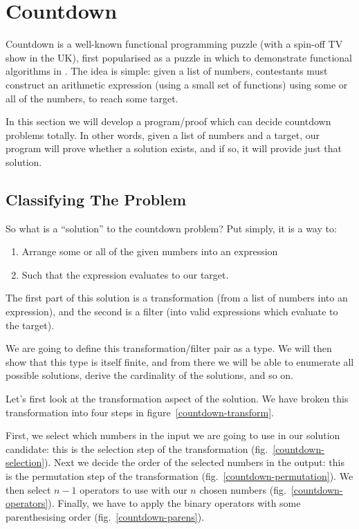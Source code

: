 \chapter{Countdown}
Countdown is a well-known functional programming puzzle (with a spin-off TV show
in the UK), first popularised as a puzzle in which to demonstrate functional
algorithms in \cite{huttonCountdownProblem2002}.
The idea is simple: given a list of numbers, contestants must construct an
arithmetic expression (using a small set of functions) using some or all of the
numbers, to reach some target.


In this section we will develop a program/proof which can decide countdown
problems totally.
In other words, given a list of numbers and a target, our program will prove
whether a solution exists, and if so, it will provide just that solution.
\section{Classifying The Problem}
So what is a ``solution'' to the countdown problem?
Put simply, it is a way to:
\begin{enumerate}
  \item Arrange some or all of the given numbers into an expression
  \item Such that the expression evaluates to our target.
\end{enumerate}
The first part of this solution is a transformation (from a list of numbers into
an expression), and the second is a filter (into valid expressions which
evaluate to the target).

We are going to define this transformation/filter pair as a type.
We will then show that this type is itself finite, and from there we will be
able to enumerate all possible solutions, derive the cardinality of the
solutions, and so on.



Let's first look at the transformation aspect of the solution.
We have broken this transformation into four steps in
figure~\ref{countdown-transform}.

First, we select which numbers in the input we are going to use in our solution
candidate: this is the selection step of the transformation
(fig.~\ref{countdown-selection}).
Next we decide the order of the selected numbers in the output: this is the
permutation step of the transformation (fig.~\ref{countdown-permutation}).
We then select \(n-1\) operators to use with our \(n\) chosen numbers
(fig.~\ref{countdown-operators}).
Finally, we have to apply the binary operators with some parenthesising order
(fig.~\ref{countdown-parens}).

